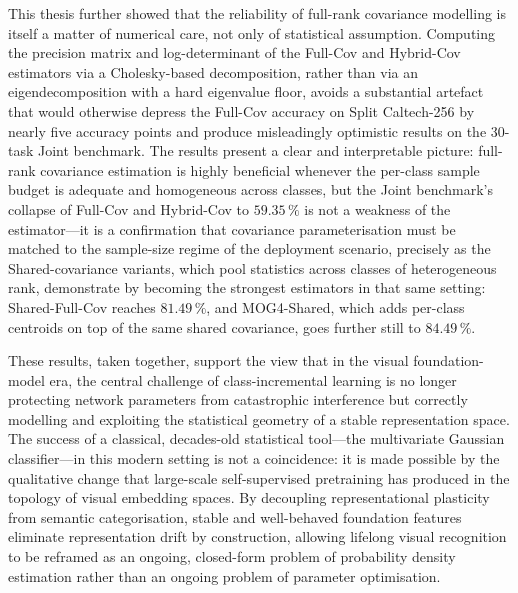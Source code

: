This thesis further showed that the reliability of full-rank covariance modelling is itself a matter of numerical care, not only of statistical assumption. Computing the precision matrix and log-determinant of the Full-Cov and Hybrid-Cov estimators via a Cholesky-based decomposition, rather than via an eigendecomposition with a hard eigenvalue floor, avoids a substantial artefact that would otherwise depress the Full-Cov accuracy on Split Caltech-256 by nearly five accuracy points and produce misleadingly optimistic results on the 30-task Joint benchmark. The results present a clear and interpretable picture: full-rank covariance estimation is highly beneficial whenever the per-class sample budget is adequate and homogeneous across classes, but the Joint benchmark's collapse of Full-Cov and Hybrid-Cov to $59.35\,\%$ is not a weakness of the estimator---it is a confirmation that covariance parameterisation must be matched to the sample-size regime of the deployment scenario, precisely as the Shared-covariance variants, which pool statistics across classes of heterogeneous rank, demonstrate by becoming the strongest estimators in that same setting: Shared-Full-Cov reaches $81.49\,\%$, and MOG4-Shared, which adds per-class centroids on top of the same shared covariance, goes further still to $84.49\,\%$.

These results, taken together, support the view that in the visual foundation-model era, the central challenge of class-incremental learning is no longer protecting network parameters from catastrophic interference but correctly modelling and exploiting the statistical geometry of a stable representation space. The success of a classical, decades-old statistical tool---the multivariate Gaussian classifier---in this modern setting is not a coincidence: it is made possible by the qualitative change that large-scale self-supervised pretraining has produced in the topology of visual embedding spaces. By decoupling representational plasticity from semantic categorisation, stable and well-behaved foundation features eliminate representation drift by construction, allowing lifelong visual recognition to be reframed as an ongoing, closed-form problem of probability density estimation rather than an ongoing problem of parameter optimisation.

